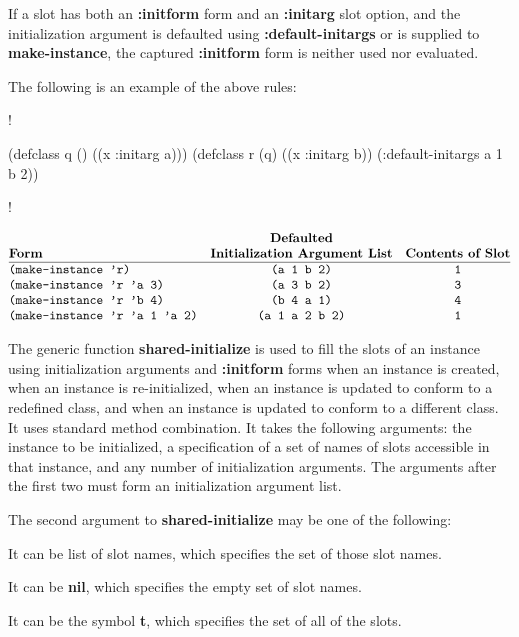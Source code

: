 If a slot has both an {\bf :initform} form and an {\bf
:initarg} slot option, and the initialization argument is defaulted
using {\bf :default-initargs} or is supplied to {\bf make-instance},
the captured {\bf :initform} form is neither used nor evaluated.

The following is an example of the above rules:

\screen!

  (defclass q () ((x :initarg a)))
  (defclass r (q) ((x :initarg b))
    (:default-initargs a 1 b 2))

\endscreen!

$$\vbox{\halign{\strut#\hfil&\quad\hfil#\hfil&\quad\hfil#\hfil\cr
{}&\bf Defaulted&{}\cr
\bf Form&\bf Initialization Argument List&\bf Contents of Slot\cr
\noalign{\hrule}
{\tt (make-instance 'r)}&{\tt (a 1 b 2)}&{\tt 1}\cr
{\tt (make-instance 'r 'a 3)}&{\tt (a 3 b 2)}&{\tt 3}\cr
{\tt (make-instance 'r 'b 4)}&{\tt (b 4 a 1)}&{\tt 4}\cr
{\tt (make-instance 'r 'a 1 'a 2)}&{\tt (a 1 a 2 b 2)}&{\tt 1}\cr}}$$

\endsubSection%


The generic function {\bf shared-initialize} is used to fill the slots
of an instance using initialization arguments and {\bf :initform}
forms when an instance is created, when an instance is re-initialized,
when an instance is updated to conform to a redefined class, and when
an instance is updated to conform to a different class. It uses
standard method combination. It takes the following arguments: the
instance to be initialized, a specification of a set of names of slots
accessible in that instance, and any number of initialization
arguments.  The arguments after the first two must form an initialization
argument list.

The second argument to {\bf shared-initialize} may be one of the following:

\beginlist

\item{\bull} It can be list of slot names, which specifies
the set of those slot names. 

\item{\bull} It can be {\bf nil}, which specifies the empty set of
slot names.

\item{\bull} It can be the symbol {\bf t}, which specifies the set of
all of the slots.

\endlist

